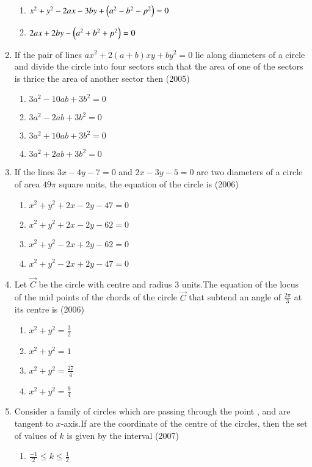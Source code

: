\documentclass[journal,12pt,twocolumn]{IEEEtran}
\theoremstyle{remark}
\begin{document}
\begin{enumerate}[start=6]
\begin{enumerate}
\item $x^2+y^2-2ax-3by+\left(a^2-b^2-p^2\right)=0$
\item $2ax+2by-\left(a^2+b^2+p^2\right)=0$
\end{enumerate}
\item If the pair of lines $ax^2+2(a+b)xy+by^2=0$ lie along diameters of a circle and divide the circle into four sectors such that the area of one of the sectors is thrice the area of another sector then
\hfill{(2005)}
\begin{enumerate}
\item $3a^2-10ab+3b^2=0$
\item $3a^2-2ab+3b^2=0$
\item $3a^2+10ab+3b^2=0$
\item $3a^2+2ab+3b^2=0$
\end{enumerate}
\item If the lines $3x-4y-7=0$ and $2x-3y-5=0$ are two diameters of a circle of area $49\pi$ square units, the equation of the circle is 
\hfill{(2006)}
\begin{enumerate}
\item $x^2+y^2+2x-2y-47=0$
\item $x^2+y^2+2x-2y-62=0$
\item $x^2+y^2-2x+2y-62=0$
\item $x^2+y^2-2x+2y-47=0$
\end{enumerate}
\item Let $\vec{C}$ be the circle with centre  and radius 3 units.The equation of the locus of the mid points of the chords of the circle $\vec{C}$ that subtend an angle of $\frac{2\pi}{3}$ at its centre is
\hfill{(2006)}
\begin{multicols}{2}
\begin{enumerate}
\item $x^2+y^2=\frac{3}{2}$
\item $x^2+y^2=1$
\item $x^2+y^2=\frac{27}{4}$
\item $x^2+y^2=\frac{9}{4}$
\end{enumerate}
\end{multicols}
\item Consider a family of circles which are passing through the point , and are tangent to $x$-axis.If  are the coordinate of the centre of the circles, then the set of values of $k$ is given by the interval
\hfill{(2007)}
\begin{multicols}{2}
\begin{enumerate}
\item $\frac{-1}{2} \le k \le \frac{1}{2}$

\end{enumerate}
\end{multicols}
\end{enumerate}
\end{document}
